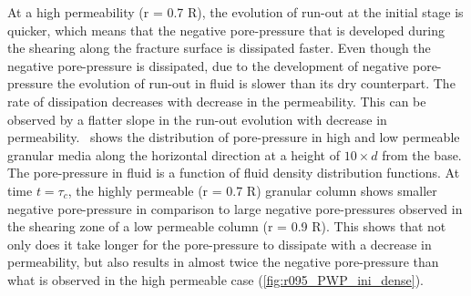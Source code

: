 At a high permeability (r = 0.7 R), the evolution of run-out at the initial 
stage is quicker, which means that the negative pore-pressure that is developed 
during the shearing along the fracture surface is dissipated faster. Even 
though the negative pore-pressure is dissipated, due to 
the development of negative pore-pressure the evolution of run-out in fluid is 
slower than its dry counterpart. The rate of dissipation decreases with 
decrease in the permeability. This can be observed by a flatter slope in the 
run-out evolution with decrease in permeability.~ shows 
the distribution of pore-pressure in high and low permeable granular media 
along the horizontal direction at a height of $10 \times d$ from the base. The 
pore-pressure in fluid is a function of fluid density distribution functions. 
At time $t = \tau_c$, the highly permeable (r = 0.7 R) granular column 
shows smaller negative pore-pressure in comparison to large negative 
pore-pressures observed in the shearing zone of a low permeable column (r = 0.9 
R). This shows that not only does it take longer for the pore-pressure to 
dissipate with a decrease in permeability, but also results in almost twice the 
negative pore-pressure than what is observed in the high permeable case 
(\cref{fig:r095_PWP_ini_dense}).

